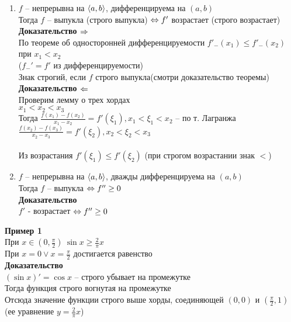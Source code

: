 \documentclass[12pt]{article}
\begin{document}
\begin{enumerate}
    \item $f$ -- непрерывна на $\langle a, b \rangle$, дифференцируема на $(a,b)$\\
    Тогда $f$ -- выпукла (строго выпукла) $\Leftrightarrow f'$ возрастает (строго возрастает)\\
    \textbf{Доказательство $\Rightarrow$}\\
    По теореме об односторонней дифференцируемости $f'_-(x_1) \leq f'_-(x_2)$ при $x_1 < x_2$\\
    ($f_-' = f'$ из дифференцируемости)\\
    Знак строгий, если $f$ строго выпукла(смотри доказательство теоремы)\\
    \textbf{Доказательство $\Leftarrow$}\\
    Проверим лемму о трех хордах\\
    $x_1 < x_2 < x_3$\\
    Тогда $\frac{f(x_1)-f(x_2)}{x_1-x_2} = f'(\xi_1), x_1 < \xi_1 < x_2$ -- по т. Лагранжа\\
    $\frac{f(x_2)-f(x_3)}{x_2-x_3} = f'(\xi_2), x_2 < \xi_2 < x_3$\\\\
    Из возрастания $f'(\xi_1) \leq f'(\xi_2)$ (при строгом возрастании знак $<$)
    \item $f$ -- непрерывна на $\langle a, b \rangle$, дважды дифференцируема на $(a,b)$\\
    Тогда $f$ -- выпукла $\Leftrightarrow f'' \geq 0$\\
    \textbf{Доказательство}\\
    $f'$ - возрастает $\Leftrightarrow f'' \geq 0$
\end{enumerate}
\textbf{Пример 1}\\
При $x \in (0, \frac \pi2)\ \sin x \geq \frac2\pi x$\\
При $x = 0 \lor x = \frac\pi2$ достигается равенство\\
\textbf{Доказательство}\\
$(\sin x)' = \cos x$ -- строго убывает на промежутке\\
Тогда функция строго вогнутая на промежутке\\
Отсюда значение функции строго выше хорды, соединяющей $(0, 0)$ и $(\frac\pi2, 1)$ (ее уравнение $y = \frac2\pi x$)
\end{document}
